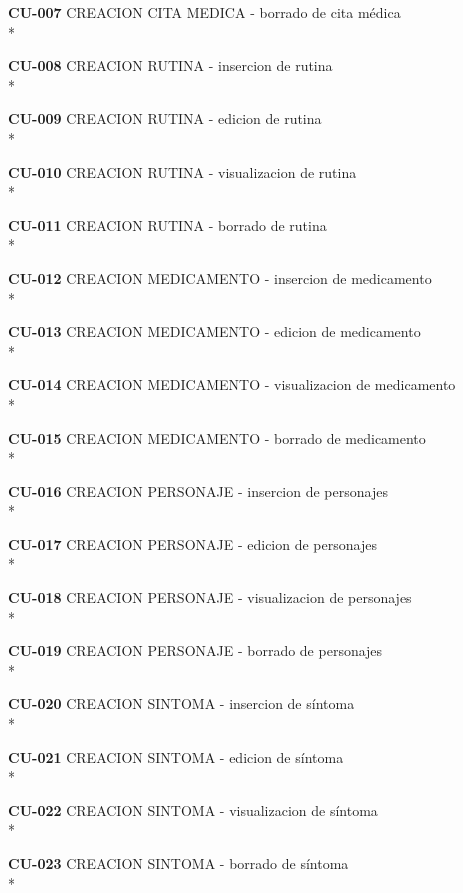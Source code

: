 \documentclass[../pfc.tex]{subfiles}
\begin{document}
	\textbf{CU-007}	CREACION CITA MEDICA - borrado de cita médica\\*
	
	
	
	\textbf{CU-008}	CREACION RUTINA - insercion de rutina\\*
	
	\textbf{CU-009}	CREACION RUTINA - edicion de rutina\\*
	
	\textbf{CU-010}	CREACION RUTINA - visualizacion de rutina\\*
	
	\textbf{CU-011}	CREACION RUTINA - borrado de rutina\\*
	
	
	
	\textbf{CU-012}	CREACION MEDICAMENTO - insercion de medicamento\\*
	
	\textbf{CU-013}	CREACION MEDICAMENTO - edicion de medicamento\\*
	
	\textbf{CU-014}	CREACION MEDICAMENTO - visualizacion de medicamento\\*
	
	\textbf{CU-015}	CREACION MEDICAMENTO - borrado de medicamento\\*
	
	
	
	\textbf{CU-016}	CREACION PERSONAJE - insercion de personajes\\*
	
	\textbf{CU-017}	CREACION PERSONAJE - edicion de personajes\\*
	
	\textbf{CU-018}	CREACION PERSONAJE - visualizacion de personajes\\*
	
	\textbf{CU-019}	CREACION PERSONAJE - borrado de personajes\\*
	
	
	
	\textbf{CU-020}	CREACION SINTOMA - insercion de síntoma\\*
	
	\textbf{CU-021}	CREACION SINTOMA - edicion de síntoma\\*
	
	\textbf{CU-022}	CREACION SINTOMA - visualizacion de síntoma\\*
	
	\textbf{CU-023}	CREACION SINTOMA - borrado de síntoma\\*
	
\end{document}
